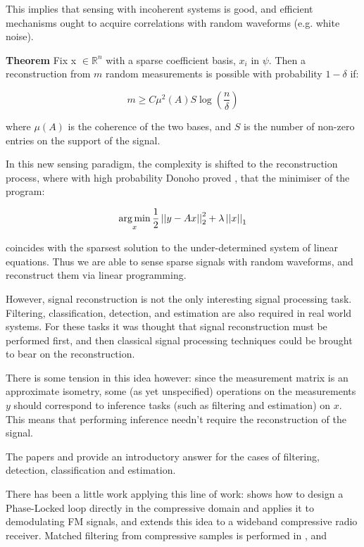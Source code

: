 This implies that sensing with incoherent systems is good, and efficient mechanisms ought to acquire correlations with random waveforms (e.g. white noise).

\textbf{Theorem} \cite{Candes2006}
Fix x \(\in \mathbb{R}^n\) with a sparse coefficient basis, \(x_{i}\) in \(\psi\). Then a reconstruction from \(m\) random measurements is possible with probability \(1 - \delta\) if: 

\begin{equation}
m \geq C \mu^2(A) S \log\left(\frac{n}{\delta}\right)
\end{equation}
\label{minsamples}

where \( \mu(A)\) is the coherence of the two bases, and \(S\) is the number of non-zero entries on the support of the signal. 

In this new sensing paradigm, the complexity is shifted to the reconstruction process, where with high probability Donoho proved \cite{donoho2004neighborly}, that the minimiser of the program:

\begin{equation}
\operatorname*{arg\,min}_{x} \frac{1}{2}\left|\left|y-Ax\right|\right|_2^2 + \lambda\left|\left|x\right|\right|_1
\end{equation}

coincides with the sparsest solution to the under-determined system of linear equations. Thus we are able to sense sparse signals with random waveforms, and reconstruct them via linear programming.

However, signal reconstruction is not the only interesting signal processing task. Filtering, classification, detection, and estimation are also required in real world systems. For these tasks it was thought that signal reconstruction must be performed first, and then classical signal processing techniques could be brought to bear on the reconstruction. 

There is some tension in this idea however: since the measurement matrix is an approximate isometry, some (as yet unspecified) operations on the measurements \(y\) should correspond to inference tasks (such as filtering and estimation) on \(x\). This means that performing inference needn’t require the reconstruction of the signal. 

The papers \cite{davenport2010signal} and \cite{davenport2007smashed} provide an introductory answer for the cases of filtering, detection, classification and estimation.

There has been a little work applying this line of work: \cite{schnelle2012compressive} shows how to design a Phase-Locked loop directly in the compressive domain and applies it to demodulating FM signals, and \cite{davenport2010wideband} extends this idea to a wideband compressive radio receiver. Matched filtering from compressive samples is performed in \cite{eftekhari2013matched}, and 

